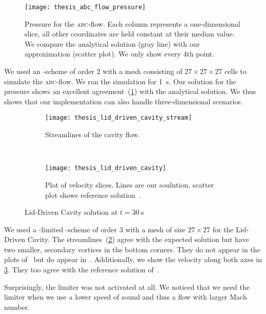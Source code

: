 \begin{figure}[htb]
  \centering
  \texttt{[image: thesis\_abc\_flow\_pressure]}
  \caption{\label{fig:abc-result}%
  Pressure for the \textsc{abc}-flow.
  Each column represents a one-dimensional slice, all other coordinates are held constant at their median value.
  We compare the analytical solution (gray line) with our approximation (scatter plot).
  We only show every 4th point.}
\end{figure}
We used an \aderdg{}-scheme of order 2 with a mesh consisting of $27 \times 27 \times 27$ cells to simulate the \textsc{abc}-flow.
We ran the simulation for \SI{1}{\s}.
Our solution for the pressure shows an excellent agreement~(\cref{fig:abc-result}) with the analytical solution.
We thus shows that our implementation can also handle three-dimensional scenarios.

\begin{figure}[htb]
  \centering
  \begin{subfigure}[t]{0.4\textwidth}
    \centering
    \texttt{[image: thesis\_lid\_driven\_cavity\_stream]}
    \caption{\label{fig:lid-driven-cavity-streamlines}%
      Streamlines of the cavity flow.}
  \end{subfigure}~%
  \begin{subfigure}[t]{0.7\textwidth}
    \centering
    \texttt{[image: thesis\_lid\_driven\_cavity]}
    \caption{\label{fig:lid-driven-cavity-result}%
      Plot of velocity slices. Lines are our soulution, scatter plot shows reference solution~\cite{ghia1982high}.}
  \end{subfigure}
  
  \caption{Lid-Driven Cavity solution at $t=\SI{30}{\s}$}
  \label{fig:lid-driven-cavity}
\end{figure}
We used a \muscl{}-limited \aderdg{}-scheme of order 3 with a mesh of size $27 \times 27$ for the Lid-Driven Cavity.
The streamlines~(\cref{fig:lid-driven-cavity-streamlines}) agree with the expected solution but have two smaller, secondary vortices in the bottom corners.
They do not appear in the plots of~\cite{dumbser2010arbitrary} but do appear in~\cite{ghia1982high}.
Additionally, we show the velocity along both axes in \cref{fig:lid-driven-cavity-result}.
They too agree with the reference solution of~\cite{ghia1982high}.

Surprisingly, the limiter was not activated at all.
We noticed that we need the limiter when we use a lower speed of sound and thus a flow with larger Mach number.

